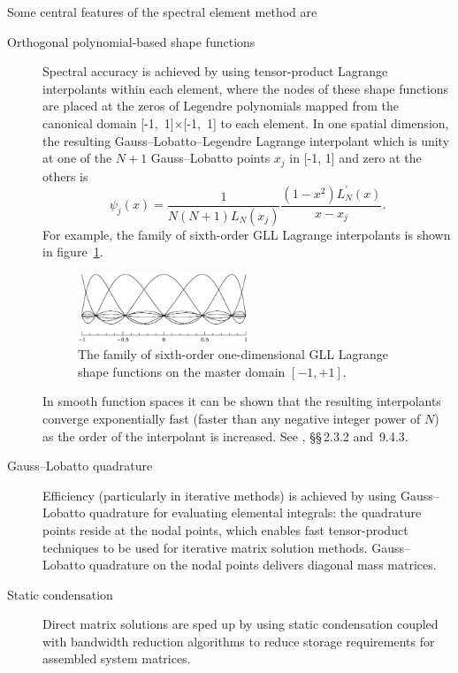 \documentclass[11pt,a4paper]{report}
\begin{document}
Some central features of the spectral element method are
\begin{description}
\item[Orthogonal polynomial-based shape functions] Spectral accuracy
is achieved by using tensor-product Lagrange interpolants within each
element, where the nodes of these shape functions are placed at the
zeros of Legendre polynomials mapped from the canonical domain
[-1,~1]$\times$[-1,~1] to each element.  In one spatial dimension, the
resulting Gauss--Lobatto--Legendre Lagrange interpolant which is unity
at one of the $N + 1$ Gauss--Lobatto points $x_j$ in [-1, 1] and zero at
the others is
\begin{equation}
\psi_j(x) = \frac{1}{N(N+1)L_N(x_j)}\frac{(1-x^2)L_N^\prime(x)}{x - x_j}.
\end{equation}
For example, the family of sixth-order GLL Lagrange interpolants is
shown in figure~\ref{fig:shapes}.
\begin{figure}

\begin{center}
  \includegraphics[width=0.5\textwidth]{shape7x7.eps}
\end{center}
\caption{The family of sixth-order one-dimensional GLL Lagrange shape
  functions on the master domain $[-1,+1]$.}
\label{fig:shapes}
\end{figure}
In smooth function spaces it can be shown that the resulting
interpolants converge exponentially fast (faster than any negative
integer power of $N$) as the order of the interpolant is increased.
See \citet{chqz88}, \S\S\,2.3.2 and~9.4.3.
\item[Gauss--Lobatto quadrature] Efficiency (particularly in iterative
  methods) is achieved by using Gauss--Lobatto quadrature for
  evaluating elemental integrals: the quadrature points reside at the
  nodal points, which enables fast tensor-product techniques to be
  used for iterative matrix solution methods.  Gauss--Lobatto
  quadrature on the nodal points delivers diagonal mass matrices.
\item[Static condensation]
Direct matrix solutions are sped up by using static condensation
coupled with bandwidth reduction algorithms to reduce storage
requirements for assembled system matrices.
\end{description}
\end{document}

